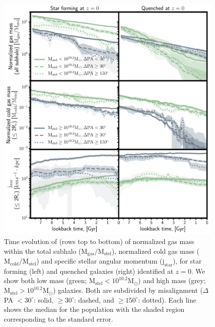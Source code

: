 \begin{figure}
	\includegraphics[width=\linewidth]{misalignment_BH/time_evo_supplement_no_feedback_median.pdf}
    \caption{Time evolution of (rows top to bottom) of normalized gas mass within the total subhalo ($\mathrm{M_{gas}/M_{stel}}$), normalized cold gas mass ($\mathrm{M_{cold}/M_{stel}}$) and specific stellar angular momentum ($\mathrm{j_{star}}$), for star forming (left) and quenched galaxies (right) identified at $z=0$. We show both low mass (green; $\mathrm{M_{stel} < 10^{10.2}M_{\odot}}$) and high mass (grey; $\mathrm{M_{stel} > 10^{10.2}M_{\odot}}$) galaxies. Both are subdivided by misalignment ($\Delta$PA $< 30^{\circ}$: solid, $\geq 30^{\circ}$: dashed, and  $\geq 150^{\circ}$: dotted). Each line shows the median for the population with the shaded region corresponding to the standard error.}
    \label{fig:overall_pop_additional}
\end{figure}

